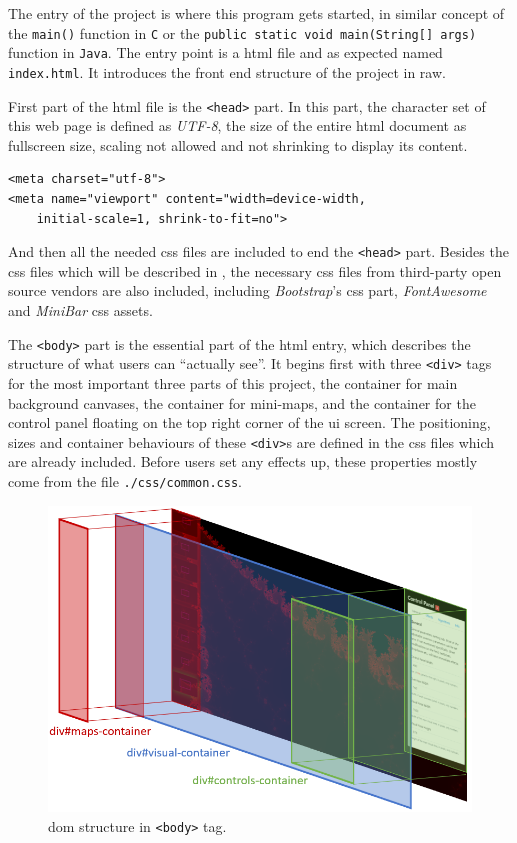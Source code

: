 The entry of the project is where this program gets started, in similar concept of the \texttt{main()} function in \texttt{C} or the \texttt{public static void main(String[] args)} function in \texttt{Java}. The entry point is a \gls{html} file and as expected named \texttt{index.html}. It introduces the front end structure of the project in raw.

First part of the \gls{html} file is the \texttt{<head>} part. In this part, the character set of this web page is defined as \emph{UTF-8}, the size of the entire \gls{html} document as fullscreen size, scaling not allowed and not shrinking to display its content.

\begin{verbatim}
<meta charset="utf-8">
<meta name="viewport" content="width=device-width,
    initial-scale=1, shrink-to-fit=no">
\end{verbatim}

And then all the needed \gls{css} files are included to end the \texttt{<head>} part. Besides the \gls{css} files which will be described in , the necessary \gls{css} files from third-party open source vendors are also included, including \emph{Bootstrap}'s \gls{css} part, \emph{FontAwesome} and \emph{MiniBar} \gls{css} assets.

The \texttt{<body>} part is the essential part of the \gls{html} entry, which describes the structure of what users can ``actually see''. It begins first with three \texttt{<div>} tags for the most important three parts of this project, the container for main background canvases, the container for mini-maps, and the container for the control panel floating on the top right corner of the \gls{ui} screen. The positioning, sizes and container behaviours of these \texttt{<div>}s are defined in the \gls{css} files which are already included. Before users set any effects up, these properties mostly come from the file \texttt{./css/common.css}.

\begin{figure}[th]
\centering
\includegraphics[width=\textwidth,keepaspectratio]{Figures/Chapter4/rootdom.png}
\decoRule
\caption[DOM Body Structure]{\gls{dom} structure in \texttt{<body>} tag.}
\label{fig:rootdom}
\end{figure}


